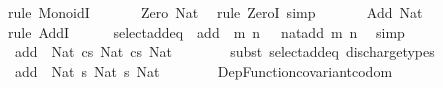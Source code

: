 \begin{isabellebody}
%
\isadelimproof
%
\endisadelimproof
%
\isatagproof
{}\isamarkupfalse%
\ {\isacharparenleft}{\kern0pt}rule\ MonoidI{\isacharparenright}{\kern0pt}\isanewline
\ \ \isamarkupfalse%
\ {\isachardoublequoteopen}{\isacharparenleft}{\kern0pt}{\isasymnat}{\isacharcomma}{\kern0pt}\ {\isacharplus}{\kern0pt}{\isacharparenright}{\kern0pt}\ {\isacharcolon}{\kern0pt}\ Zero\ Nat{\isachardoublequoteclose}\ \isamarkupfalse%
\ {\isacharparenleft}{\kern0pt}rule\ ZeroI{\isacharparenright}{\kern0pt}\ simp\isanewline
\ \ \isamarkupfalse%
\ {\isachardoublequoteopen}{\isacharparenleft}{\kern0pt}{\isasymnat}{\isacharcomma}{\kern0pt}\ {\isacharplus}{\kern0pt}{\isacharparenright}{\kern0pt}\ {\isacharcolon}{\kern0pt}\ Add\ Nat{\isachardoublequoteclose}\isanewline
\ \ \isanewline
\ \ \isanewline
\ \ \isamarkupfalse%
\ {\isacharparenleft}{\kern0pt}rule\ AddI{\isacharparenright}{\kern0pt}\isanewline
\ \ \ \ \isamarkupfalse%
\ select{\isacharunderscore}{\kern0pt}add{\isacharunderscore}{\kern0pt}eq{\isacharcolon}{\kern0pt}\ {\isachardoublequoteopen}{\isacharparenleft}{\kern0pt}{\isasymnat}{\isacharcomma}{\kern0pt}\ {\isacharplus}{\kern0pt}{\isacharparenright}{\kern0pt}{\isacharat}{\kern0pt}{\isacharat}{\kern0pt}add\ {\isacharequal}{\kern0pt}\ {\isasymlambda}m\ n\ {\isasymin}\ {\isasymnat}{\isachardot}{\kern0pt}\ nat{\isacharunderscore}{\kern0pt}add\ m\ n{\isachardoublequoteclose}\ \isamarkupfalse%
\ simp\isanewline
\ \ \ \ \isamarkupfalse%
\ {\isachardoublequoteopen}{\isacharparenleft}{\kern0pt}{\isasymnat}{\isacharcomma}{\kern0pt}\ {\isacharplus}{\kern0pt}{\isacharparenright}{\kern0pt}{\isacharat}{\kern0pt}{\isacharat}{\kern0pt}add\ {\isacharcolon}{\kern0pt}\ Nat\ {\isasymrightarrow}cs\ Nat\ {\isasymrightarrow}cs\ Nat{\isachardoublequoteclose}\isanewline
\ \ \ \ \ \ \isamarkupfalse%
\ {\isacharparenleft}{\kern0pt}subst\ select{\isacharunderscore}{\kern0pt}add{\isacharunderscore}{\kern0pt}eq{\isacharparenright}{\kern0pt}\ discharge{\isacharunderscore}{\kern0pt}types\isanewline
\ \ \ \ \isamarkupfalse%
\ \isamarkupfalse%
\ {\isachardoublequoteopen}{\isacharparenleft}{\kern0pt}{\isasymnat}{\isacharcomma}{\kern0pt}\ {\isacharplus}{\kern0pt}{\isacharparenright}{\kern0pt}{\isacharat}{\kern0pt}{\isacharat}{\kern0pt}add\ {\isacharcolon}{\kern0pt}\ Nat\ {\isasymrightarrow}s\ Nat\ {\isasymrightarrow}s\ Nat{\isachardoublequoteclose}\isanewline
\ \ \ \ \ \ \isamarkupfalse%
\ Dep{\isacharunderscore}{\kern0pt}Function{\isacharunderscore}{\kern0pt}covariant{\isacharunderscore}{\kern0pt}codom\ \isamarkupfalse%

\end{isabellebody}
